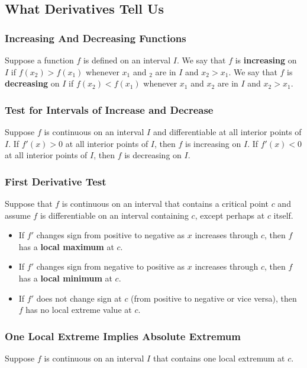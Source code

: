 %
%
%

\subsection{What Derivatives Tell Us}
\subsubsection{Increasing And Decreasing Functions}
Suppose a function $f$ is defined on an interval $I$. We say that $f$ is \textbf{increasing} on $I$ if $f(x_2) > f(x_1)$ whenever $x_1$ and $_2$ are in $I$ and $x_2 > x_1$. We say that $f$ is \textbf{decreasing} on $I$ if $f(x_2) < f(x_1)$ whenever $x_1$ and $x_2$ are in $I$ and $x_2 > x_1$.

\subsubsection{Test for Intervals of Increase and Decrease}
Suppose $f$ is continuous on an interval $I$ and differentiable at all interior points of $I$. If $f'(x) > 0$ at all interior points of $I$, then $f$ is increasing on $I$. If $f'(x) < 0$ at all interior points of $I$, then $f$ is decreasing on $I$.

\subsubsection{First Derivative Test}
Suppose that $f$ is continuous on an interval that contains a critical point $c$ and assume $f$ is differentiable on an interval containing $c$, except perhaps at $c$ itself.

\begin{itemize}
    \item If $f'$ changes sign from positive to negative as $x$ increases through $c$, then $f$ has a \textbf{local maximum} at $c$.
    \item If $f'$ changes sign from negative to positive as $x$ increases through $c$, then $f$ has a \textbf{local minimum} at $c$.
    \item If $f'$ does not change sign at $c$ (from positive to negative or vice versa), then $f$ has no local extreme value at $c$.
\end{itemize}

\subsubsection{One Local Extreme Implies Absolute Extremum}
Suppose $f$ is continuous on an interval $I$ that contains one local extremum at $c$.

